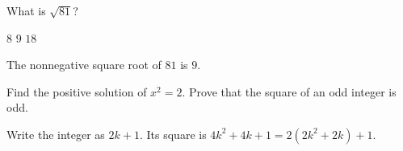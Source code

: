 \documentclass{exam}
\begin{document}
\begin{questions}
\question[2] What is $\sqrt{81}$?
\begin{choices}
\choice $8$
\CorrectChoice $9$
\choice $18$
\end{choices}
\begin{solution}The nonnegative square root of $81$ is $9$.\end{solution}
\question[3] Find the positive solution of $x^2=2$.
\question[5] Prove that the square of an odd integer is odd.
\begin{solution}
Write the integer as $2k+1$. Its square is $4k^2+4k+1=2(2k^2+2k)+1$.
\end{solution}
\end{questions}
\end{document}

